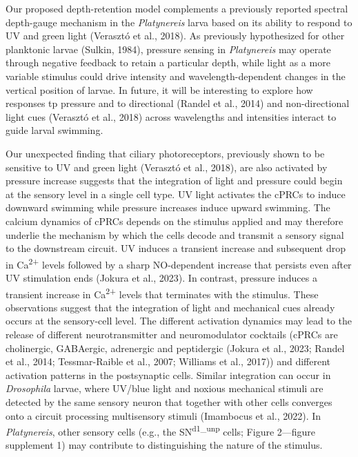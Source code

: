 \documentclass[
  11pt,
]{article}
\begin{document}
Our proposed depth-retention model complements a previously reported
spectral depth-gauge mechanism in the \emph{Platynereis} larva based on
its ability to respond to UV and green light (Verasztó et al., 2018). As
previously hypothesized for other planktonic larvae (Sulkin, 1984),
pressure sensing in \emph{Platynereis} may operate through negative
feedback to retain a particular depth, while light as a more variable
stimulus could drive intensity and wavelength-dependent changes in the
vertical position of larvae. In future, it will be interesting to
explore how responses tp pressure and to directional (Randel et al.,
2014) and non-directional light cues (Verasztó et al., 2018) across
wavelengths and intensities interact to guide larval swimming.

Our unexpected finding that ciliary photoreceptors, previously shown to
be sensitive to UV and green light (Verasztó et al., 2018), are also
activated by pressure increase suggests that the integration of light
and pressure could begin at the sensory level in a single cell type. UV
light activates the cPRCs to induce downward swimming while pressure
increases induce upward swimming. The calcium dynamics of cPRCs depends
on the stimulus applied and may therefore underlie the mechanism by
which the cells decode and transmit a sensory signal to the downstream
circuit. UV induces a transient increase and subsequent drop in
Ca\textsuperscript{2+} levels followed by a sharp NO-dependent increase
that persists even after UV stimulation ends (Jokura et al., 2023). In
contrast, pressure induces a transient increase in
Ca\textsuperscript{2+} levels that terminates with the stimulus. These
observations suggest that the integration of light and mechanical cues
already occurs at the sensory-cell level. The different activation
dynamics may lead to the release of different neurotransmitter and
neuromodulator cocktails (cPRCs are cholinergic, GABAergic, adrenergic
and peptidergic (Jokura et al., 2023; Randel et al., 2014;
Tessmar-Raible et al., 2007; Williams et al., 2017)) and different
activation patterns in the postsynaptic cells. Similar integration can
occur in \emph{Drosophila} larvae, where UV/blue light and noxious
mechanical stimuli are detected by the same sensory neuron that together
with other cells converges onto a circuit processing multisensory
stimuli (Imambocus et al., 2022). In \emph{Platynereis}, other sensory
cells (e.g., the SN\textsuperscript{d1\_unp} cells; Figure 2---figure
supplement 1) may contribute to distinguishing the nature of the
stimulus.
\end{document}
